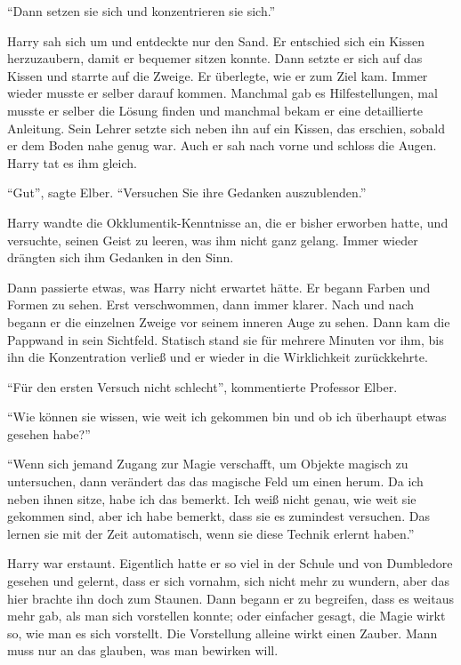 \enquote{Dann setzen sie sich und konzentrieren sie sich.}

Harry sah sich um und entdeckte nur den Sand. Er entschied sich ein Kissen herzuzaubern, damit er bequemer sitzen konnte. Dann setzte er sich auf das Kissen und starrte auf die Zweige. Er überlegte, wie er zum Ziel kam. Immer wieder musste er selber darauf kommen. Manchmal gab es Hilfestellungen, mal musste er selber die Lösung finden und manchmal bekam er eine detaillierte Anleitung. Sein Lehrer setzte sich neben ihn auf ein Kissen, das erschien, sobald er dem Boden nahe genug war. Auch er sah nach vorne und schloss die Augen. Harry tat es ihm gleich.

\enquote{Gut}, sagte Elber. \enquote{Versuchen Sie ihre Gedanken auszublenden.}

Harry wandte die Okklumentik-Kenntnisse an, die er bisher erworben hatte, und versuchte, seinen Geist zu leeren, was ihm nicht ganz gelang. Immer wieder drängten sich ihm Gedanken in den Sinn.

Dann passierte etwas, was Harry nicht erwartet hätte. Er begann Farben und Formen zu sehen. Erst verschwommen, dann immer klarer. Nach und nach begann er die einzelnen Zweige vor seinem inneren Auge zu sehen. Dann kam die Pappwand in sein Sichtfeld. Statisch stand sie für mehrere Minuten vor ihm, bis ihn die Konzentration verließ und er wieder in die Wirklichkeit zurückkehrte.

\enquote{Für den ersten Versuch nicht schlecht}, kommentierte Professor Elber.

\enquote{Wie können sie wissen, wie weit ich gekommen bin und ob ich überhaupt etwas gesehen habe?}

\enquote{Wenn sich jemand Zugang zur Magie verschafft, um Objekte magisch zu untersuchen, dann verändert das das magische Feld um einen herum. Da ich neben ihnen sitze, habe ich das bemerkt. Ich weiß nicht genau, wie weit sie gekommen sind, aber ich habe bemerkt, dass sie es zumindest versuchen. Das lernen sie mit der Zeit automatisch, wenn sie diese Technik erlernt haben.}

Harry war erstaunt. Eigentlich hatte er so viel in der Schule und von Dumbledore gesehen und gelernt, dass er sich vornahm, sich nicht mehr zu wundern, aber das hier brachte ihn doch zum Staunen. Dann begann er zu begreifen, dass es weitaus mehr gab, als man sich vorstellen konnte; oder einfacher gesagt, die Magie wirkt so, wie man es sich vorstellt. Die Vorstellung alleine wirkt einen Zauber. Mann muss nur an das glauben, was man bewirken will.

